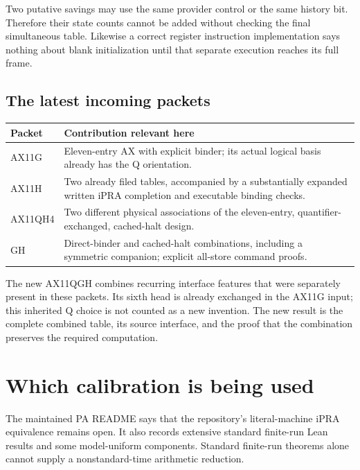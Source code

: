 \documentclass[11pt,letterpaper]{article}
\begin{document}
Two putative savings may use the same provider control or the same
history bit. Therefore their state counts cannot be added without
checking the final simultaneous table. Likewise a correct register
instruction implementation says nothing about blank initialization until
that separate execution reaches its full frame.

\subsection{The latest incoming packets}

\begin{center}
\begin{tabularx}{\linewidth}{@{}lX@{}}
\toprule Packet & Contribution relevant here\\\midrule
AX11G & Eleven-entry AX with explicit binder; its actual logical basis
already has the Q orientation.\\
AX11H & Two already filed tables, accompanied by a substantially expanded
written iPRA completion and executable binding checks.\\
AX11QH4 & Two different physical associations of the eleven-entry,
quantifier-exchanged, cached-halt design.\\
GH & Direct-binder and cached-halt combinations, including a symmetric
companion; explicit all-store command proofs.\\
\bottomrule
\end{tabularx}
\end{center}

The new AX11QGH combines recurring interface features that were separately
present in these packets. Its sixth head is already exchanged in the
AX11G input; this inherited Q choice is not counted as a new invention.
The new result is the complete combined table, its source interface, and
the proof that the combination preserves the required computation.

\section{Which calibration is being used}
\label{sec:calibration}

The maintained PA README says that the repository's literal-machine iPRA
equivalence remains open. It also records extensive standard finite-run
Lean results and some model-uniform components. Standard finite-run
theorems alone cannot supply a nonstandard-time arithmetic reduction.
\end{document}
